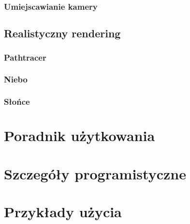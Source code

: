 \documentclass[inz,longabstract]{iithesis}
\begin{document}
        \subsection{Umiejscawianie kamery}
    \section{Realistyczny rendering}
        \subsection{Pathtracer}
        \subsection{Niebo}
        \subsection{Słońce}
        
\chapter{Poradnik użytkowania}

\chapter{Szczegóły programistyczne}

\chapter{Przykłady użycia}





\end{document}
